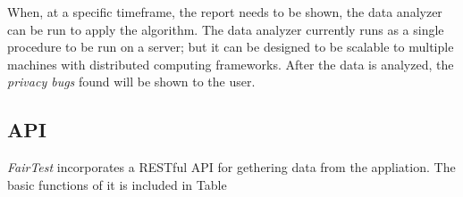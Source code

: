 When, at a specific timeframe, the report needs to be shown, the data analyzer
can be run to apply the algorithm. The data analyzer currently runs as a single
procedure to be run on a server; but it can be designed to be scalable to
multiple machines with distributed computing frameworks. After the data is
analyzed, the \textit{privacy bugs} found will be shown to the user.

\subsection{API}

\textit{FairTest} incorporates a RESTful API for gethering data from the
appliation. The basic functions of it is included in Table 
